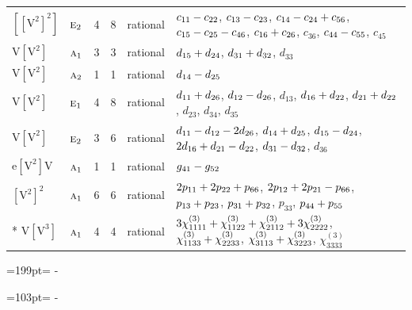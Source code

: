 \documentclass[10pt,a4paper]{article}
\newcommand{\needspace}[1]{\par\penalty-100\begingroup\dimen0=#1\relax\dimen2=\pagegoal
  \advance\dimen2-\pagetotal\ifdim\dimen0>\dimen2\relax\ifdim\dimen2>0pt\vfil\break\fi\fi
  \endgroup}
\numberwithin{equation}{section}
\newcommand{\irr}[1]{\text{\normalfont\scshape #1}}
\newcommand{\jahn}[1]{\mathrm{#1}}
\newlength{\fillwidth}\newlength{\cellwidth}\newlength{\colwidth}
\newcommand{\signbreak}{\penalty100\relax}
\begin{document}
{\begin{longtable}{@{}llrrl>{\RaggedRight\arraybackslash}p{\fillwidth}@{}}
$\jahn{[[V^{2}]^{2}]}$ & $\irr{e}_{2}$ & 4 & 8 & rational & $c_{11} -\signbreak c_{22}$, $c_{13} -\signbreak c_{23}$, $c_{14} -\signbreak c_{24} +\signbreak c_{56}$, $c_{15} -\signbreak c_{25} -\signbreak c_{46}$, $c_{16} +\signbreak c_{26}$, $c_{36}$, $c_{44} -\signbreak c_{55}$, $c_{45}$\\
$\jahn{V[V^{2}]}$ & $\irr{a}_{1}$ & 3 & 3 & rational & $d_{15} +\signbreak d_{24}$, $d_{31} +\signbreak d_{32}$, $d_{33}$\\
$\jahn{V[V^{2}]}$ & $\irr{a}_{2}$ & 1 & 1 & rational & $d_{14} -\signbreak d_{25}$\\
$\jahn{V[V^{2}]}$ & $\irr{e}_{1}$ & 4 & 8 & rational & $d_{11} +\signbreak d_{26}$, $d_{12} -\signbreak d_{26}$, $d_{13}$, $d_{16} +\signbreak d_{22}$, $d_{21} +\signbreak d_{22}$, $d_{23}$, $d_{34}$, $d_{35}$\\
$\jahn{V[V^{2}]}$ & $\irr{e}_{2}$ & 3 & 6 & rational & $d_{11} -\signbreak d_{12} -\signbreak 2d_{26}$, $d_{14} +\signbreak d_{25}$, $d_{15} -\signbreak d_{24}$, $2d_{16} +\signbreak d_{21} -\signbreak d_{22}$, $d_{31} -\signbreak d_{32}$, $d_{36}$\\
$\jahn{e[V^{2}]V}$ & $\irr{a}_{1}$ & 1 & 1 & rational & $\mathnormal{g}_{41} -\signbreak \mathnormal{g}_{52}$\\
$\jahn{[V^{2}]^{2}}$ & $\irr{a}_{1}$ & 6 & 6 & rational & $2p_{11} +\signbreak 2p_{22} +\signbreak p_{66}$, $2p_{12} +\signbreak 2p_{21} -\signbreak p_{66}$, $p_{13} +\signbreak p_{23}$, $p_{31} +\signbreak p_{32}$, $p_{33}$, $p_{44} +\signbreak p_{55}$\\*
$\jahn{V[V^{3}]}$ & $\irr{a}_{1}$ & 4 & 4 & rational & $3\chi^{(3)}_{1111} +\signbreak \chi^{(3)}_{1122} +\signbreak \chi^{(3)}_{2112} +\signbreak 3\chi^{(3)}_{2222}$, $\chi^{(3)}_{1133} +\signbreak \chi^{(3)}_{2233}$, $\chi^{(3)}_{3113} +\signbreak \chi^{(3)}_{3223}$, $\chi^{(3)}_{3333}$\\
\bottomrule\end{longtable}}
\needspace{199pt}
\needspace{103pt}
\end{document}
